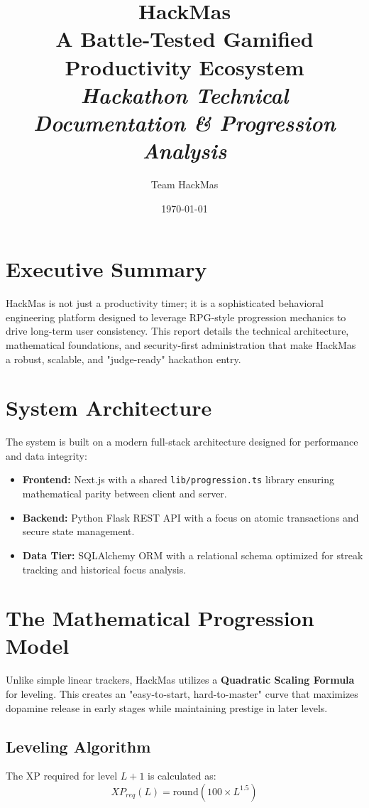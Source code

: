 \documentclass[12pt,a4paper]{article}
\title{
    \Huge \textbf{HackMas} \\ 
    \large A Battle-Tested Gamified Productivity Ecosystem \\
    \vspace{0.5cm}
    \small \textit{Hackathon Technical Documentation \& Progression Analysis}
}
\author{Team HackMas}
\date{\today}
\begin{document}
\maketitle

\section{Executive Summary}
HackMas is not just a productivity timer; it is a sophisticated behavioral engineering platform designed to leverage RPG-style progression mechanics to drive long-term user consistency. This report details the technical architecture, mathematical foundations, and security-first administration that make HackMas a robust, scalable, and "judge-ready" hackathon entry.

\section{System Architecture}
The system is built on a modern full-stack architecture designed for performance and data integrity:
\begin{itemize}
    \item \textbf{Frontend:} Next.js with a shared \texttt{lib/progression.ts} library ensuring mathematical parity between client and server.
    \item \textbf{Backend:} Python Flask REST API with a focus on atomic transactions and secure state management.
    \item \textbf{Data Tier:} SQLAlchemy ORM with a relational schema optimized for streak tracking and historical focus analysis.
\end{itemize}

\section{The Mathematical Progression Model}
Unlike simple linear trackers, HackMas utilizes a \textbf{Quadratic Scaling Formula} for leveling. This creates an "easy-to-start, hard-to-master" curve that maximizes dopamine release in early stages while maintaining prestige in later levels.

\subsection{Leveling Algorithm}
The XP required for level $L+1$ is calculated as:
\begin{equation}
XP_{req}(L) = \text{round}(100 \times L^{1.5})
\end{equation}
\end{document}

